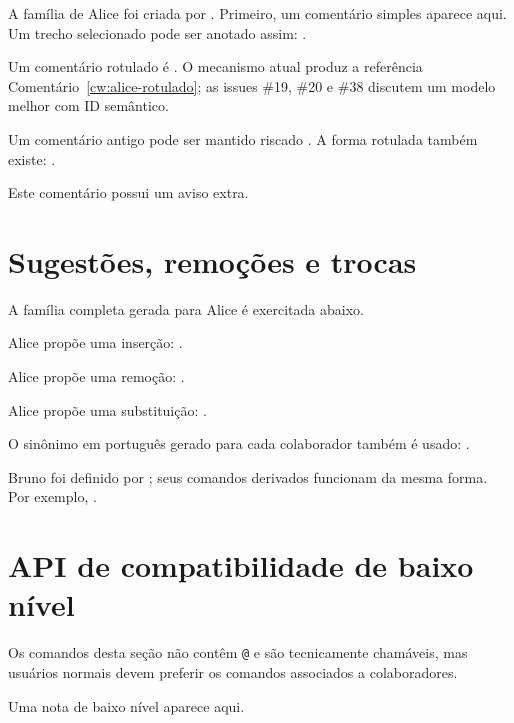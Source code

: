 \documentclass[11pt]{article}
\begin{document}
A família de Alice foi criada por \texttt{\string\cwnamedef}. Primeiro,
um comentário simples aparece aqui. Um
trecho selecionado pode ser anotado assim:
.

Um comentário rotulado é
.
O mecanismo atual produz a referência Comentário~\ref{cw:alice-rotulado};
as issues \#19, \#20 e \#38 discutem um modelo melhor com ID semântico.

Um comentário antigo pode ser mantido riscado
.
A forma rotulada também existe:
.

\cwsetcommwarn{!}
Este comentário possui um aviso extra.
\cwsetcommwarn{}

\section{Sugestões, remoções e trocas}

A família completa gerada para Alice é exercitada abaixo.

Alice propõe uma inserção: .

Alice propõe uma remoção:
.

Alice propõe uma substituição:
.

O sinônimo em português gerado para cada colaborador também é usado:
.

Bruno foi definido por \texttt{\string\cwautor}; seus comandos derivados
funcionam da mesma forma. Por exemplo,
.

\section{API de compatibilidade de baixo nível}

Os comandos desta seção não contêm \texttt{@} e são tecnicamente chamáveis,
mas usuários normais devem preferir os comandos associados a colaboradores.

Uma nota de baixo nível aparece aqui.
\end{document}
